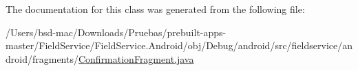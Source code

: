 The documentation for this class was generated from the following file\+:\begin{DoxyCompactItemize}
\item 
/\+Users/bsd-\/mac/\+Downloads/\+Pruebas/prebuilt-\/apps-\/master/\+Field\+Service/\+Field\+Service.\+Android/obj/\+Debug/android/src/fieldservice/android/fragments/\hyperlink{_confirmation_fragment_8java}{Confirmation\+Fragment.\+java}\end{DoxyCompactItemize}
